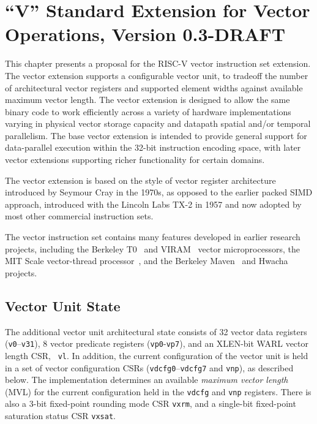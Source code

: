 \chapter{``V'' Standard Extension for Vector Operations, Version 0.3-DRAFT}
\label{sec:bits}

This chapter presents a proposal for the RISC-V vector instruction set
extension.  The vector extension supports a configurable vector unit,
to tradeoff the number of architectural vector registers and supported
element widths against available maximum vector length.  The vector
extension is designed to allow the same binary code to work
efficiently across a variety of hardware implementations varying in
physical vector storage capacity and datapath spatial and/or temporal
parallelism.  The base vector extension is intended to provide general
support for data-parallel execution within the 32-bit instruction
encoding space, with later vector extensions supporting richer
functionality for certain domains.

\begin{commentary}
The vector extension is based on the style of vector register
architecture introduced by Seymour Cray in the 1970s, as opposed to
the earlier packed SIMD approach, introduced with the Lincoln Labs
TX-2 in 1957 and now adopted by most other commercial instruction
sets.

The vector instruction set contains many features developed in earlier
research projects, including the Berkeley T0~\cite{} and VIRAM~\cite{}
vector microprocessors, the MIT Scale vector-thread processor~\cite{},
and the Berkeley Maven~\cite{} and Hwacha~\cite{} projects.
\end{commentary}

\section{Vector Unit State}

The additional vector unit architectural state consists of 32 vector
data registers ({\tt v0}--{\tt v31}), 8 vector predicate registers
({\tt vp0}-{\tt vp7}), and an XLEN-bit WARL vector length CSR, {\tt
  vl}.  In addition, the current configuration of the vector unit is
held in a set of vector configuration CSRs ({\tt vdcfg0}--{\tt vdcfg7}
and {\tt vnp}), as described below.  The implementation determines an
available {\em maximum vector length} (MVL) for the current
configuration held in the {\tt vdcfg} and {\tt vnp} registers.  There
is also a 3-bit fixed-point rounding mode CSR {\tt vxrm}, and a
single-bit fixed-point saturation status CSR {\tt vxsat}.

